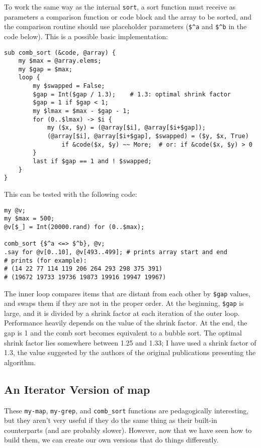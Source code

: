 To work the same way as the internal {\tt sort}, a sort 
function must receive as parameters a comparison function 
or code block and the array to be sorted, and the 
comparison routine should use placeholder parameters (\verb'$^a' 
and  \verb'$^b' in the code below). This is a possible 
basic implementation:

\begin{verbatim}
sub comb_sort (&code, @array) {
    my $max = @array.elems;
    my $gap = $max;
    loop {
        my $swapped = False;
        $gap = Int($gap / 1.3);    # 1.3: optimal shrink factor
        $gap = 1 if $gap < 1;
        my $lmax = $max - $gap - 1;
        for (0..$lmax) -> $i {
            my ($x, $y) = (@array[$i], @array[$i+$gap]);
            (@array[$i], @array[$i+$gap], $swapped) = ($y, $x, True)
                if &code($x, $y) ~~ More;  # or: if &code($x, $y) > 0
        }
        last if $gap == 1 and ! $swapped;
    }
}
\end{verbatim}

This can be tested with the following code:

\begin{verbatim}
my @v;
my $max = 500;
@v[$_] = Int(20000.rand) for (0..$max);

comb_sort {$^a <=> $^b}, @v;
.say for @v[0..10], @v[493..499]; # prints array start and end
# prints (for example):
# (14 22 77 114 119 206 264 293 298 375 391)
# (19672 19733 19736 19873 19916 19947 19967)
\end{verbatim}

The inner loop compares items that are distant from each 
other by \verb'$gap' values, and swaps them if they are 
not in the proper order. At the beginning, \verb'$gap' 
is large, and it is divided by a shrink factor at each 
iteration of the outer loop. Performance heavily depends
on the value of the shrink factor. At the end, the gap 
is 1 and the comb sort becomes equivalent to a bubble 
sort. The optimal shrink factor lies somewhere between 1.25 
and 1.33; I have used a shrink factor of 1.3, the value 
suggested by the authors of the original publications 
presenting the algorithm.

\subsection{An Iterator Version of map}

These {\tt my-map}, {\tt my-grep}, and {\tt comb\_sort} 
functions are pedagogically interesting, but they aren't 
very useful if they do the same thing as their built-in 
counterparts (and are probably slower). However, now 
that we have seen how to build them, we can create our 
own versions that do things differently.

